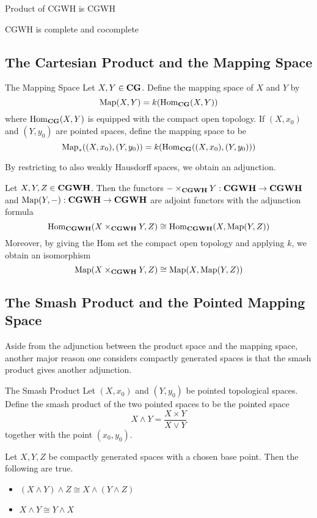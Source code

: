 \documentclass[a4paper]{article}
\begin{document}
\begin{prp}{}{} Product of CGWH is CGWH
\end{prp}

CGWH is complete and cocomplete

\subsection{The Cartesian Product and the Mapping Space}
\begin{defn}{The Mapping Space}{} Let $X,Y\in\bold{CG}$. Define the mapping space of $X$ and $Y$ by $$\text{Map}(X,Y)=k(\operatorname{Hom}_{\bold{CG}}(X,Y))$$ where $\operatorname{Hom}_{\bold{CG}}(X,Y)$ is equipped with the compact open topology. If $(X,x_0)$ and $(Y,y_0)$ are pointed spaces, define the mapping space to be $$\text{Map}_\ast((X,x_0),(Y,y_0))=k(\operatorname{Hom}_{\bold{CG}}((X,x_0),(Y,y_0)))$$
\end{defn}

By restricting to also weakly Hausdorff spaces, we obtain an adjunction. 

\begin{thm}{}{} Let $X,Y,Z\in\bold{CGWH}$. Then the functors $-\times_{\bold{CGWH}}Y:\bold{CGWH}\to\bold{CGWH}$ and $\text{Map}(Y,-):\bold{CGWH}\to\bold{CGWH}$ are adjoint functors with the adjunction formula $$\operatorname{Hom}_{\bold{CGWH}}(X\times_{\bold{CGWH}}Y,Z)\cong\operatorname{Hom}_{\bold{CGWH}}(X,\text{Map}(Y,Z))$$ Moreover, by giving the Hom set the compact open topology and applying $k$, we obtain an isomorphism $$\text{Map}(X\times_{\bold{CGWH}}Y,Z)\cong\text{Map}(X,\text{Map}(Y,Z))$$
\end{thm}

\subsection{The Smash Product and the Pointed Mapping Space}
Aside from the adjunction between the product space and the mapping space, another major reason one considers compactly generated spaces is that the smash product gives another adjunction. 

\begin{defn}{The Smash Product}{} Let $(X,x_0)$ and $(Y,y_0)$ be pointed topological spaces. Define the smash product of the two pointed spaces to be the pointed space $$X\wedge Y=\frac{X\times Y}{X\vee Y}$$ together with the point $(x_0,y_0)$. 
\end{defn}

\begin{prp}{}{} Let $X,Y,Z$ be compactly generated spaces with a chosen base point. Then the following are true. 
\begin{itemize}
\item $(X\wedge Y)\wedge Z\cong X\wedge(Y\wedge Z)$
\item $X\wedge Y\cong Y\wedge X$
\end{itemize}
\end{prp}
\end{document}
